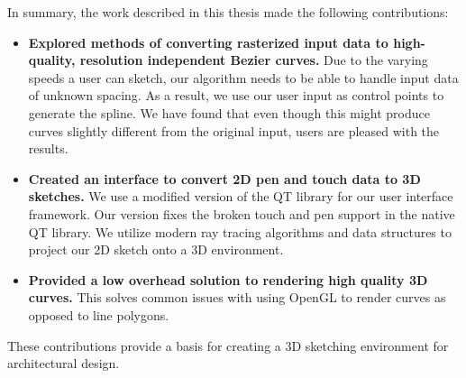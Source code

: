 In summary, the work described in this thesis made the following contributions:
\begin{itemize}
\item {\textbf{Explored methods of converting rasterized input data to high-quality, resolution independent Bezier curves.} Due to the varying speeds a user can sketch, our algorithm needs to be able to handle input data of unknown spacing. As a result, we use our user input as control points to generate the spline. We have found that even though this might produce curves slightly different from the original input, users are pleased with the results.}
\item{\textbf{Created an interface to convert 2D pen and touch data to 3D sketches.} We use a modified version of the QT library for our user interface framework. Our version fixes the broken touch and pen support in the native QT library. We utilize modern ray tracing algorithms and data structures to project our 2D sketch onto a 3D environment.}
\item{\textbf{Provided a low overhead solution to rendering high quality 3D curves.} This solves common issues with using OpenGL to render curves as opposed to line polygons.}
\end{itemize}
These contributions provide a basis for creating a 3D sketching environment for architectural design.

